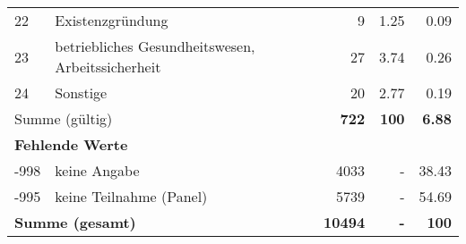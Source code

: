 \begin{longtable}{lXrrr}
        22 & \multicolumn{1}{X}{Existenzgründung} & %
          \num{9} &
          \num[round-mode=places,round-precision=2]{1.25} &
          \num[round-mode=places,round-precision=2]{0.09} \\

        23 & \multicolumn{1}{X}{betriebliches Gesundheitswesen, Arbeitssicherheit} & %
          \num{27} &
          \num[round-mode=places,round-precision=2]{3.74} &
          \num[round-mode=places,round-precision=2]{0.26} \\

        24 & \multicolumn{1}{X}{Sonstige} & %
          \num{20} &
          \num[round-mode=places,round-precision=2]{2.77} &
          \num[round-mode=places,round-precision=2]{0.19} \\

     \midrule
     \multicolumn{2}{l}{Summe (gültig)} &
       \textbf{\num{722}} &
     \textbf{\num{100}} &
       \textbf{\num[round-mode=places,round-precision=2]{6.88}} \\
     \multicolumn{5}{l}{\textbf{Fehlende Werte}}\\
       -998 &
       keine Angabe &
         \num{4033} &
        - &
         \num[round-mode=places,round-precision=2]{38.43} \\
       -995 &
       keine Teilnahme (Panel) &
         \num{5739} &
        - &
         \num[round-mode=places,round-precision=2]{54.69} \\
     \midrule
     \multicolumn{2}{l}{\textbf{Summe (gesamt)}} &
          \textbf{\num{10494}} &
        \textbf{-} &
        \textbf{\num{100}} \\
     \bottomrule
     \end{longtable}
     
